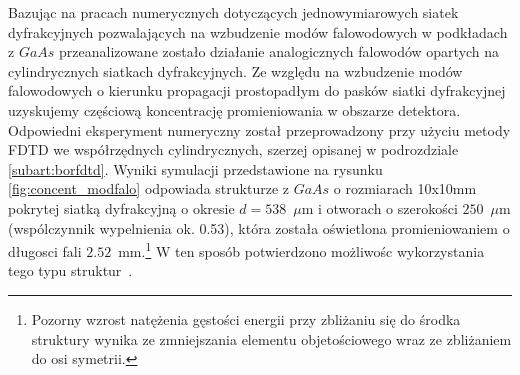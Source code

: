 Bazując na pracach numerycznych dotyczących  jednowymiarowych siatek dyfrakcyjnych pozwalających na wzbudzenie modów falowodowych w podkładach z $GaAs$ przeanalizowane zostało działanie analogicznych falowodów opartych na cylindrycznych siatkach dyfrakcyjnych. Ze względu na wzbudzenie modów falowodowych o kierunku propagacji prostopadłym do pasków siatki dyfrakcyjnej uzyskujemy częściową koncentrację promieniowania w obszarze detektora. Odpowiedni eksperyment numeryczny został przeprowadzony przy użyciu metody FDTD we współrzędnych cylindrycznych, szerzej opisanej w podrozdziale \ref{subart:borfdtd}. Wyniki symulacji przedstawione na rysunku \ref{fig:concent_modfalo} odpowiada strukturze z $GaAs$ o rozmiarach 10x10mm pokrytej siatką dyfrakcyjną o okresie $d=538$~$\mu$m i otworach o szerokości $250$~$\mu$m (wspólczynnik wypelnienia ok. 0.53), która została oświetlona promieniowaniem o długosci fali $2.52$~mm.\footnote{Pozorny wzrost natężenia gęstości energii przy zbliżaniu się do środka struktury wynika ze zmniejszania elementu objetościowego wraz ze zbliżaniem do osi symetrii.} W ten sposób potwierdzono możliwośc wykorzystania tego typu struktur~\cite{Stolarek2011}.

